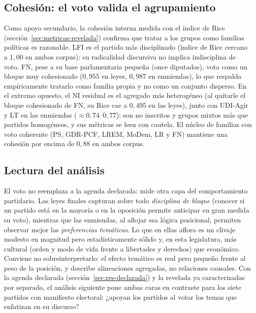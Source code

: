 \subsection{Cohesión: el voto valida el agrupamiento}
\label{sec:res-revelada-cohesion}

Como apoyo secundario, la cohesión interna medida con el índice de Rice
(sección~\ref{sec:metricas-revelada}) confirma que tratar a los grupos como
familias políticas es razonable. LFI es el partido más disciplinado (índice de
Rice cercano a $1{,}00$ en ambos corpus): su radicalidad discursiva no implica
indisciplina de voto. FN, pese a su base parlamentaria pequeña (once diputados),
vota como un bloque muy cohesionado ($0{,}955$ en leyes, $0{,}987$ en enmiendas),
lo que respalda empíricamente tratarlo como familia propia y no como un conjunto
disperso. En el extremo opuesto, el NI residual es el agregado más heterogéneo
(al quitarle el bloque cohesionado de FN, su Rice cae a $0{,}495$ en las
leyes), junto con UDI-Agir y LT en las enmiendas ($\approx 0{,}74$--$0{,}77$):
son no inscritos y grupos mixtos más que partidos homogéneos, y sus métricas se
leen con cautela. El núcleo de familias con voto coherente (PS, GDR-PCF, LREM,
MoDem, LR y FN) mantiene una cohesión por encima de $0{,}88$ en ambos corpus.

\subsection{Lectura del análisis}
\label{sec:res-revelada-cierre}

El voto no reemplaza a la agenda declarada: mide otra capa del comportamiento
partidario. Las leyes finales capturan sobre todo \emph{disciplina de bloque}
(conocer si un partido está en la mayoría o en la oposición permite anticipar
en gran medida su voto), mientras que las enmiendas, al aflojar esa lógica
posicional, permiten observar mejor las \emph{preferencias temáticas}. Lo que en
ellas aflora es un clivaje modesto en magnitud pero estadísticamente sólido y,
en esta legislatura, más cultural (orden y modo de vida frente a libertades y
derechos) que económico. Conviene no sobreinterpretarlo: el efecto temático es
real pero pequeño frente al peso de la posición, y describe alineaciones
agregadas, no relaciones causales. Con la agenda declarada
(sección~\ref{sec:res-declarada}) y la revelada ya caracterizadas por separado,
el análisis siguiente pone ambas caras en contraste para los siete partidos con
manifiesto electoral: ¿apoyan los partidos al votar los temas que enfatizan en su
discurso?

